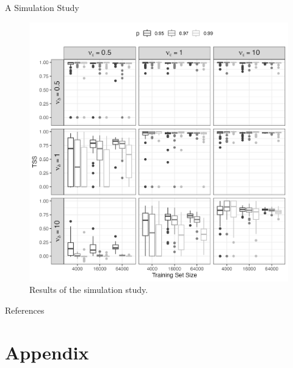 \documentclass{beamer}
\begin{document}
\begin{frame}{A Simulation Study}
    \begin{figure}[h!]
        \centering
        \includegraphics[scale=0.4]{sim_study07.png}
        \caption{Results of the simulation study.}
        \label{fig:sim_study07}
    \end{figure}
\end{frame}

\begin{frame}[allowframebreaks]{References}
    \printbibliography
\end{frame}

\section{Appendix}
\end{document}
